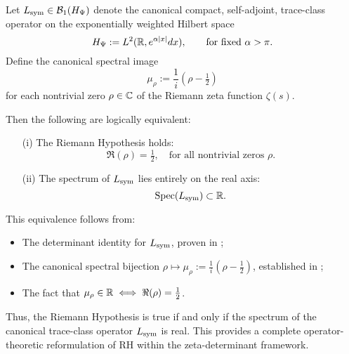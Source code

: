 \begin{theorem}
\label{thm:rh_spectrum_equiv}

Let \( L_{\mathrm{sym}} \in \mathcal{B}_1(H_{\Psi}) \) denote the canonical compact, self-adjoint, trace-class operator on the exponentially weighted Hilbert space
\[
H_{\Psi} := L^2(\mathbb{R}, e^{\alpha |x|} dx), \qquad \text{for fixed } \alpha > \pi.
\]
Define the canonical spectral image
\[
\mu_\rho := \frac{1}{i}(\rho - \tfrac{1}{2})
\]
for each nontrivial zero \( \rho \in \mathbb{C} \) of the Riemann zeta function \( \zeta(s) \).

Then the following are logically equivalent:
\begin{enumerate}
  \item[\textup{(i)}] The Riemann Hypothesis holds:
  \[
  \Re(\rho) = \tfrac{1}{2}, \quad \text{for all nontrivial zeros } \rho.
  \]

  \item[\textup{(ii)}] The spectrum of \( L_{\mathrm{sym}} \) lies entirely on the real axis:
  \[
  \operatorname{Spec}(L_{\mathrm{sym}}) \subset \mathbb{R}.
  \]
\end{enumerate}

\medskip

\noindent
This equivalence follows from:
\begin{itemize}
  \item The determinant identity for \( L_{\mathrm{sym}} \), proven in ;
  \item The canonical spectral bijection \( \rho \mapsto \mu_\rho := \frac{1}{i}(\rho - \tfrac{1}{2}) \), established in ;
  \item The fact that \( \mu_\rho \in \mathbb{R} \iff \Re(\rho) = \tfrac{1}{2} \).
\end{itemize}

\medskip

\noindent
Thus, the Riemann Hypothesis is true if and only if the spectrum of the canonical trace-class operator \( L_{\mathrm{sym}} \) is real. This provides a complete operator-theoretic reformulation of RH within the zeta-determinant framework.
\end{theorem}

